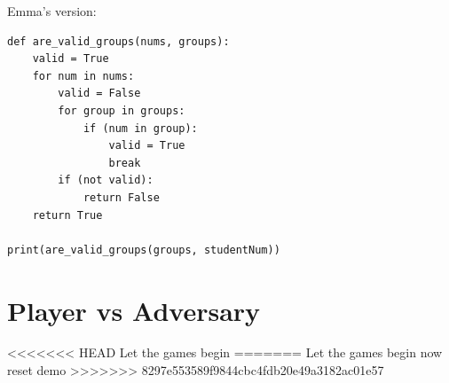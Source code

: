 \documentclass[twocolumn, 10pt]{article}
\begin{document}
Emma's version:

\footnotesize
\begin{verbatim}
def are_valid_groups(nums, groups):
    valid = True
    for num in nums:
        valid = False
        for group in groups:
            if (num in group): 
                valid = True
                break
        if (not valid):
            return False
    return True

print(are_valid_groups(groups, studentNum))
\end{verbatim}
\normalsize

\section{Player vs Adversary}
<<<<<<< HEAD
Let the games begin
=======
Let the games begin now reset demo
>>>>>>> 8297e553589f9844cbc4fdb20e49a3182ac01e57
\end{document}
